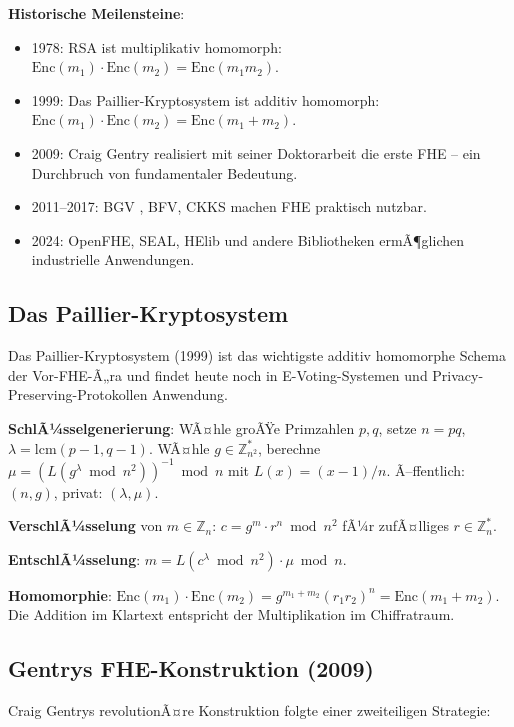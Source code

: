 ﻿\documentclass[a4paper,12pt]{scrreprt}
\theoremstyle{definition}
\begin{document}
\textbf{Historische Meilensteine}:
\begin{itemize}
    \item 1978: RSA ist multiplikativ homomorph: $\mathrm{Enc}(m_1)\cdot\mathrm{Enc}(m_2) = \mathrm{Enc}(m_1 m_2)$.
    \item 1999: Das Paillier-Kryptosystem ist additiv homomorph: $\mathrm{Enc}(m_1)\cdot\mathrm{Enc}(m_2) = \mathrm{Enc}(m_1+m_2)$.
    \item 2009: Craig Gentry realisiert mit seiner Doktorarbeit \cite{Gen09} die erste FHE -- ein Durchbruch von fundamentaler Bedeutung.
    \item 2011--2017: BGV \cite{BGV12}, BFV, CKKS \cite{CKKS17} machen FHE praktisch nutzbar.
    \item 2024: OpenFHE, SEAL, HElib und andere Bibliotheken ermÃ¶glichen industrielle Anwendungen.
\end{itemize}

\subsection{Das Paillier-Kryptosystem}

Das Paillier-Kryptosystem (1999) ist das wichtigste additiv homomorphe Schema der Vor-FHE-Ã„ra und findet heute noch in E-Voting-Systemen und Privacy-Preserving-Protokollen Anwendung.

\textbf{SchlÃ¼sselgenerierung}: WÃ¤hle groÃŸe Primzahlen $p, q$, setze $n = pq$, $\lambda = \mathrm{lcm}(p-1,q-1)$. WÃ¤hle $g \in \mathbb{Z}_{n^2}^*$, berechne $\mu = (L(g^\lambda \bmod n^2))^{-1} \bmod n$ mit $L(x) = (x-1)/n$. Ã–ffentlich: $(n,g)$, privat: $(\lambda,\mu)$.

\textbf{VerschlÃ¼sselung} von $m \in \mathbb{Z}_n$: $c = g^m \cdot r^n \bmod n^2$ fÃ¼r zufÃ¤lliges $r \in \mathbb{Z}_n^*$.

\textbf{EntschlÃ¼sselung}: $m = L(c^\lambda \bmod n^2) \cdot \mu \bmod n$.

\textbf{Homomorphie}: $\mathrm{Enc}(m_1) \cdot \mathrm{Enc}(m_2) = g^{m_1+m_2}(r_1r_2)^n = \mathrm{Enc}(m_1+m_2)$. Die Addition im Klartext entspricht der Multiplikation im Chiffratraum.

\subsection{Gentrys FHE-Konstruktion (2009)}

Craig Gentrys revolutionÃ¤re Konstruktion \cite{Gen09} folgte einer zweiteiligen Strategie:
\end{document}
